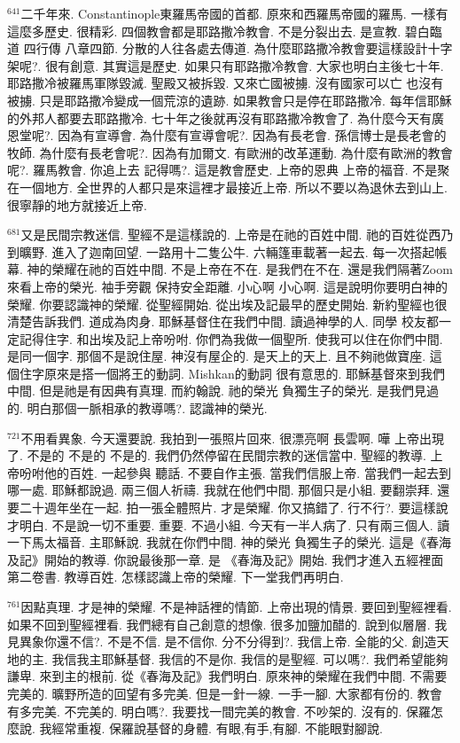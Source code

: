\documentclass{book}
\begin{document}
$^{641}$二千年來.
Constantinople東羅馬帝國的首都.
原來和西羅馬帝國的羅馬.
一樣有這麼多歷史.
很精彩.
四個教會都是耶路撒冷教會.
不是分裂出去.
是宣教.
碧白臨道 四行傳 八章四節.
分散的人往各處去傳道.
為什麼耶路撒冷教會要這樣設計十字架呢?.
很有創意.
其實這是歷史.
如果只有耶路撒冷教會.
大家也明白主後七十年.
耶路撒冷被羅馬軍隊毀滅.
聖殿又被拆毀.
又來亡國被擄.
沒有國家可以亡 也沒有被擄.
只是耶路撒冷變成一個荒涼的遺跡.
如果教會只是停在耶路撒冷.
每年信耶穌的外邦人都要去耶路撒冷.
七十年之後就再沒有耶路撒冷教會了.
為什麼今天有廣恩堂呢?.
因為有宣導會.
為什麼有宣導會呢?.
因為有長老會.
孫信博士是長老會的牧師.
為什麼有長老會呢?.
因為有加爾文.
有歐洲的改革運動.
為什麼有歐洲的教會呢?.
羅馬教會.
你追上去 記得嗎?.
這是教會歷史.
上帝的恩典 上帝的福音.
不是聚在一個地方.
全世界的人都只是來這裡才最接近上帝.
所以不要以為退休去到山上.
很寧靜的地方就接近上帝.

$^{681}$又是民間宗教迷信.
聖經不是這樣說的.
上帝是在祂的百姓中間.
祂的百姓從西乃到曠野.
進入了迦南回望.
一路用十二隻公牛.
六輛篷車載著一起去.
每一次搭起帳幕.
神的榮耀在祂的百姓中間.
不是上帝在不在.
是我們在不在.
還是我們隔著Zoom來看上帝的榮光.
袖手旁觀 保持安全距離.
小心啊 小心啊.
這是說明你要明白神的榮耀.
你要認識神的榮耀.
從聖經開始.
從出埃及記最早的歷史開始.
新約聖經也很清楚告訴我們.
道成為肉身.
耶穌基督住在我們中間.
讀過神學的人.
同學 校友都一定記得住字.
和出埃及記上帝吩咐.
你們為我做一個聖所.
使我可以住在你們中間.
是同一個字.
那個不是說住屋.
神沒有屋企的.
是天上的天上.
且不夠祂做寶座.
這個住字原來是搭一個將王的動詞.
Mishkan的動詞 很有意思的.
耶穌基督來到我們中間.
但是祂是有因典有真理.
而約翰說.
祂的榮光 負獨生子的榮光.
是我們見過的.
明白那個一脈相承的教導嗎?.
認識神的榮光.

$^{721}$不用看異象.
今天還要說.
我拍到一張照片回來.
很漂亮啊 長雲啊.
嘩 上帝出現了.
不是的 不是的 不是的.
我們仍然停留在民間宗教的迷信當中.
聖經的教導.
上帝吩咐他的百姓.
一起參與 聽話.
不要自作主張.
當我們信服上帝.
當我們一起去到哪一處.
耶穌都說過.
兩三個人祈禱.
我就在他們中間.
那個只是小組.
要翻崇拜.
還要二十週年坐在一起.
拍一張全體照片.
才是榮耀.
你又搞錯了.
行不行?.
要這樣說才明白.
不是說一切不重要.
重要.
不過小組.
今天有一半人病了.
只有兩三個人.
讀一下馬太福音.
主耶穌說.
我就在你們中間.
神的榮光 負獨生子的榮光.
這是《春海及記》開始的教導.
你說最後那一章.
是 《春海及記》開始.
我們才進入五經裡面第二卷書.
教導百姓.
怎樣認識上帝的榮耀.
下一堂我們再明白.

$^{761}$因點真理.
才是神的榮耀.
不是神話裡的情節.
上帝出現的情景.
要回到聖經裡看.
如果不回到聖經裡看.
我們總有自己創意的想像.
很多加鹽加醋的.
說到似層層.
我見異象你還不信?.
不是不信.
是不信你.
分不分得到?.
我信上帝.
全能的父.
創造天地的主.
我信我主耶穌基督.
我信的不是你.
我信的是聖經.
可以嗎?.
我們希望能夠謙卑.
來到主的根前.
從《春海及記》我們明白.
原來神的榮耀在我們中間.
不需要完美的.
曠野所造的回望有多完美.
但是一針一線.
一手一腳.
大家都有份的.
教會有多完美.
不完美的.
明白嗎?.
我要找一間完美的教會.
不吵架的.
沒有的.
保羅怎麼說.
我經常重複.
保羅說基督的身體.
有眼,有手,有腳.
不能眼對腳說.
\end{document}

